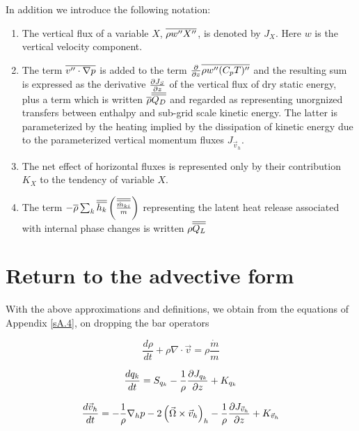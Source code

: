 In addition we introduce the following notation:
\begin{enumerate}
\item The vertical flux of a variable $X$, $\overline{\rho w''X''}$, is
denoted by $J_{X}$. Here $w$ is the
vertical velocity component.

\item The term $\overline{v''\cdot \nabla p}$ is added to the term
$\frac {\partial } {\partial z} \overline{\rho w''(C_{p}T)''}$ and the resulting sum is
expressed as the derivative $\frac {\partial J_{S}} {\partial z}$ of the vertical flux of
dry static
energy, plus a term which is written $\overline{\rho} \overline{\overline{Q_{D}}}$ 
and regarded as representing
unorgnized transfers between enthalpy and sub-grid scale kinetic
energy. The latter is parameterized by the heating implied by the
dissipation of kinetic energy due to the parameterized vertical
momentum fluxes $J_{\vec{v}_{h}}$.

\item The net effect of horizontal fluxes is represented only
by their contribution $K_{X}$ to the tendency of variable $X$.

\item The term $-\overline{\rho} \sum_{k}
\overline{\overline{h_{k}}}\left(\frac{\overline{\overline{\dot{m}_{ki}}}}{m}\right)$ representing
the latent heat release associated with
internal phase changes is written $\rho\overline{\overline{Q_{L}}}$
\end{enumerate}

\section{Return to the advective form}\label{sA.6}

With the above approximations and definitions, we obtain from the
equations of Appendix \ref{sA.4}, on dropping the bar operators

\begin{equation}
\frac{d\rho}{dt}+\rho\nabla\cdot\vec{v}=\rho\frac{\dot{m}}{m}\label{A.6.1}
\end{equation}

\begin{equation}
\frac{dq_{k}}{dt}=S_{q_{k}}-\frac{1}{\rho}\frac {\partial J_{q_{k}}} {\partial z}+K_{q_{k}}\label{A.6.2}
\end{equation}

\begin{equation}
\frac{d\vec{v}_{h}}{dt}=-\frac{1}{\rho}\nabla_{h}p-2\left(\vec{\Omega}\times
\vec{v}_{h}\right)_{h}-\frac{1}{\rho}\frac {\partial J_{\vec{v}_{h}}} {\partial z}+K_{\vec{v}_{h}}\label{A.6.3}
\end{equation}


